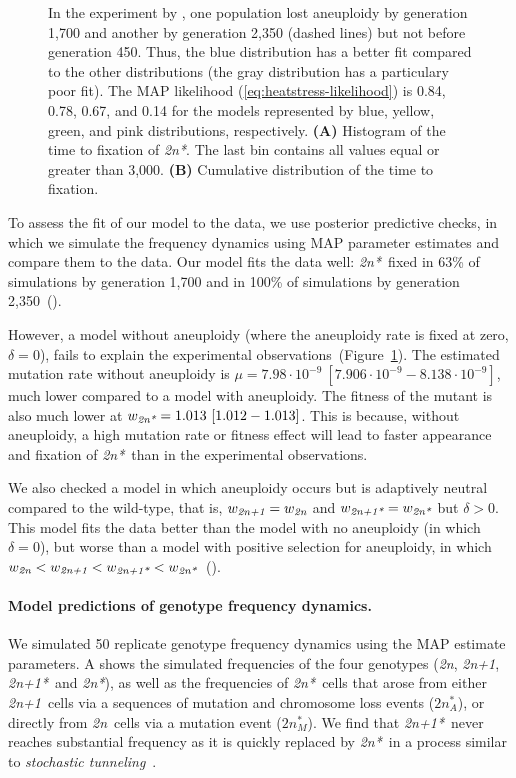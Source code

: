 \documentclass[12pt]{extarticle}
\newcommand{\euwt}{\emph{2n}}
\newcommand{\anwt}{\emph{2n+1}}
\newcommand{\eumt}{\emph{2n*}}
\newcommand{\eumtM}{\emph{$2n^*_M$}}
\newcommand{\anmt}{\emph{2n+1*}}
\begin{document}
\begin{figure}[h!]
{In the experiment by \citet{Yona2012}, one population lost aneuploidy by generation 1,700 and another by generation 2,350 (dashed lines) but not before generation 450.
Thus, the blue distribution has a better fit compared to the other distributions (the gray distribution has a particulary poor fit).
The MAP likelihood (\cref{eq:heatstress-likelihood}) is 0.84, 0.78, 0.67, and 0.14 for the models represented by blue, yellow, green, and pink distributions, respectively. 
\textbf{(A)} Histogram of the time to fixation of \eumt. The last bin contains all values equal or greater than 3,000.
\textbf{(B)} Cumulative distribution of the time to fixation. 
     }
  \label{fig:2n*-fixation}
\end{figure}

To assess the fit of our model to the data, we use posterior predictive checks, in which we simulate the frequency dynamics using MAP parameter estimates and compare them to the data.
Our model fits the data well: \eumt\ fixed in 63\% of simulations by generation 1,700 and in 100\% of simulations by generation 2,350~().
 
However, a model without aneuploidy (where the aneuploidy rate is fixed at zero, $\delta=0$), fails to explain the experimental observations~(Figure~\ref{fig:2n*-fixation}). %
The estimated mutation rate without aneuploidy is $\mu=7.98\cdot10^{-9}\ [7.906\cdot10^{-9}-8.138\cdot10^{-9}]$, much lower compared to a model with aneuploidy.
The fitness of the mutant is also much lower at $w_{\eumt}=1.013\ [1.012-1.013]$.
This is because, without aneuploidy, a high mutation rate or fitness effect will lead to faster appearance and fixation of \eumt\ than in the experimental observations. 

We also checked a model in which aneuploidy occurs but is adaptively neutral compared to the wild-type, that is, $w_{\anwt} = w_{\euwt}$ and $w_{\anmt} = w_{\eumt}$ but $\delta>0$. This model fits the data better than the model with no aneuploidy (in which $\delta=0$), but worse than a model with positive selection for aneuploidy, in which $w_{\euwt}<w_{\anwt}<w_{\anmt}<w_{\eumt}$~(). 


\paragraph{Model predictions of genotype frequency dynamics.}

We simulated 50 replicate genotype frequency dynamics using the MAP estimate parameters. 
A shows the simulated frequencies of the four genotypes (\euwt, \anwt, \anmt\ and \eumt), as well as the frequencies of \eumt\ cells that arose from either \anwt\ cells via a sequences of mutation and chromosome loss events ($2n^*_A$), or directly from \euwt\ cells via a mutation event (\eumtM).
We find that \anmt\ never reaches substantial frequency as it is quickly replaced by \eumt\ in a process similar to \emph{stochastic tunneling}~\citep{Iwasa2004,Komarova2003}.
\end{document}
